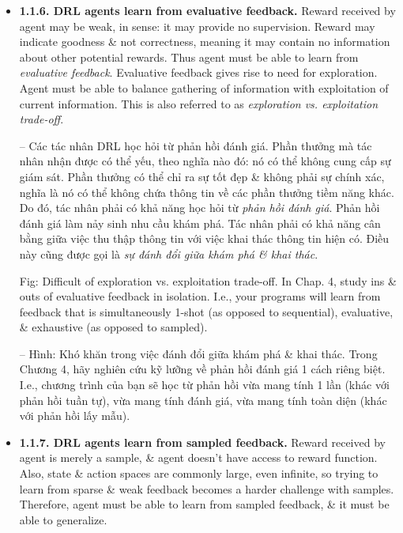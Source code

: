 \documentclass{article}
\begin{document}
\begin{itemize}
\begin{itemize}
\begin{itemize}
            {\bf Difficulty of temporal credit assignment problem.} In Chap. 3, study ins \& outs of sequential feedback in isolation. I.e., your programs learn from simultaneously sequential, supervised (as opposed to evaluative), \& exhaustive (as opposed to sampled) feedback.

            -- {\bf Khó khăn của bài toán gán tín chỉ tạm thời.} Trong Chương 3, hãy nghiên cứu chi tiết \& chi tiết về phản hồi tuần tự 1 cách riêng biệt. I.e., chương trình của bạn học từ phản hồi tuần tự, có giám sát (khác với phản hồi đánh giá), \& toàn diện (khác với phản hồi lấy mẫu) đồng thời.
            \item {\bf1.1.6. DRL agents learn from evaluative feedback.} Reward received by agent may be weak, in sense: it may provide no supervision. Reward may indicate goodness \& not correctness, meaning it may contain no information about other potential rewards. Thus agent must be able to learn from {\it evaluative feedback}. Evaluative feedback gives rise to need for exploration. Agent must be able to balance gathering of information with exploitation of current information. This is also referred to as {\it exploration vs. exploitation trade-off}.

            -- {\sf Các tác nhân DRL học hỏi từ phản hồi đánh giá.} Phần thưởng mà tác nhân nhận được có thể yếu, theo nghĩa nào đó: nó có thể không cung cấp sự giám sát. Phần thưởng có thể chỉ ra sự tốt đẹp \& không phải sự chính xác, nghĩa là nó có thể không chứa thông tin về các phần thưởng tiềm năng khác. Do đó, tác nhân phải có khả năng học hỏi từ {\it phản hồi đánh giá}. Phản hồi đánh giá làm nảy sinh nhu cầu khám phá. Tác nhân phải có khả năng cân bằng giữa việc thu thập thông tin với việc khai thác thông tin hiện có. Điều này cũng được gọi là {\it sự đánh đổi giữa khám phá \& khai thác}.

            {\sf Fig: Difficult of exploration vs. exploitation trade-off.} In Chap. 4, study ins \& outs of evaluative feedback in isolation. I.e., your programs will learn from feedback that is simultaneously 1-shot (as opposed to sequential), evaluative, \& exhaustive (as opposed to sampled).

            -- {\sf Hình: Khó khăn trong việc đánh đổi giữa khám phá \& khai thác.} Trong Chương 4, hãy nghiên cứu kỹ lưỡng về phản hồi đánh giá 1 cách riêng biệt. I.e., chương trình của bạn sẽ học từ phản hồi vừa mang tính 1 lần (khác với phản hồi tuần tự), vừa mang tính đánh giá, vừa mang tính toàn diện (khác với phản hồi lấy mẫu).
            \item {\bf1.1.7. DRL agents learn from sampled feedback.} Reward received by agent is merely a sample, \& agent doesn't have access to reward function. Also, state \& action spaces are commonly large, even infinite, so trying to learn from sparse \& weak feedback becomes a harder challenge with samples. Therefore, agent must be able to learn from sampled feedback, \& it must be able to generalize.


\end{itemize}
\end{itemize}
\end{itemize}
\end{document}
